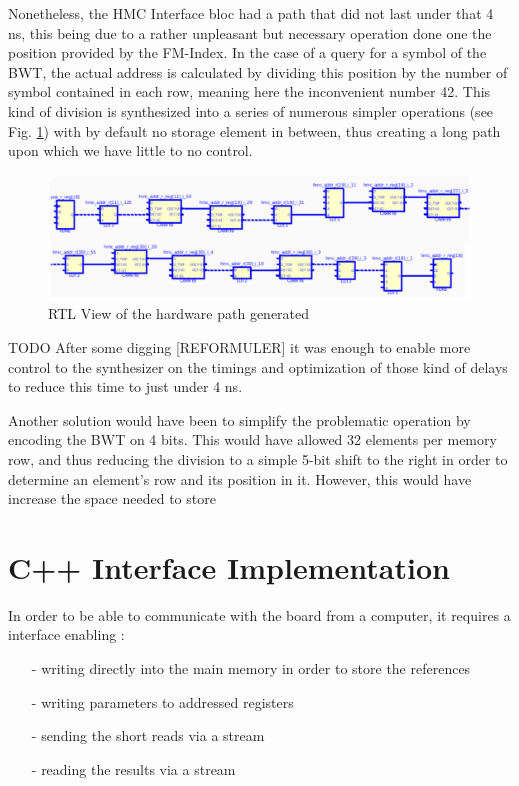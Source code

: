 Nonetheless, the HMC Interface bloc had a path that did not last under that 4 ns, this being due to a rather unpleasant but necessary operation done one the position provided by the FM-Index. In the case of a query for a symbol of the BWT, the actual address is calculated by dividing this position by the number of symbol contained in each row, meaning here the inconvenient number 42. This kind of division is synthesized into a series of numerous simpler operations (see Fig. \ref{fig:timing}) with by default no storage element in between, thus creating a long path upon which we have little to no control. \\

\begin{figure}[H]
    \centering
    \hspace*{-3mm}\includegraphics[scale = 0.4]{Figures/TIMING_RTL.png}
    \caption{RTL View of the hardware path generated}
    \label{fig:timing}
\end{figure}
TODO
After some digging [REFORMULER] it was enough to enable more control to the synthesizer on the timings and optimization of those kind of delays to reduce this time to just under 4 ns. 

Another solution would have been to simplify the problematic operation by encoding the BWT on 4 bits. This would have allowed 32 elements per memory row, and thus reducing the division to a simple 5-bit shift to the right in order to determine an element's row and its position in it. However, this would have increase the space needed to store 

\section{C++ Interface Implementation}

In order to be able to communicate with the board from a computer, it requires a interface enabling :
\begin{itemize}
    \item [-] writing directly into the main memory in order to store the references
    \item [-]writing parameters to addressed registers
    \item [-] sending the short reads via a stream
    \item [-] reading the results via a stream
\end{itemize}

